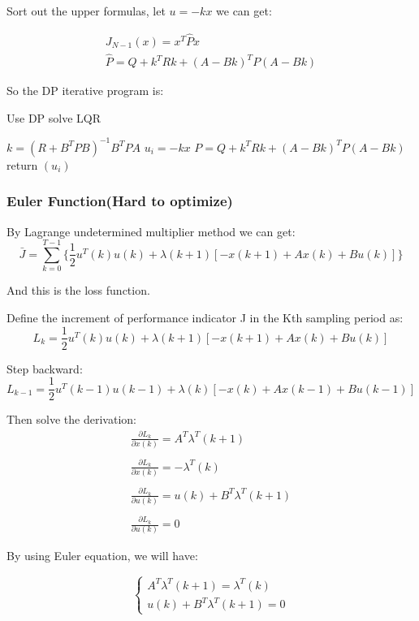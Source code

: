 \documentclass{mcmthesis}
\begin{document}
Sort out the upper formulas, let $u=-k x$ we can get:

$$\begin{array}{c}
J_{N-1}(x)=x^{T} \hat{P} x \\
\hat{P}=Q+k^{T} R k+(A-B k)^{T} P(A-B k)
\end{array}$$

So the DP  iterative program is:

\begin{algorithm}[H]
  \caption{Use DP solve LQR}
  {
    $k=\left(R+B^{T} P B\right)^{-1} B^{T} P A$ \;
$ u_{i}=-k x $\;
$ P=Q+k^{T} R k+(A-B k)^{T} P(A-B k)$
  }
  return $(u_i)$\;
\end{algorithm}

\subsubsection{Euler Function(Hard to optimize)}
By Lagrange undetermined multiplier method we can get:
$$\bar J=\sum^{T-1}_{k=0}\{\frac{1}{2}u^T(k)u(k)+\lambda(k+1)[-x(k+1)+Ax(k)+Bu(k)]\}$$

And this is the loss function.

Define the increment of performance indicator J in the Kth sampling period as:
$$L_k=\frac{1}{2}u^T(k)u(k)+\lambda(k+1)[-x(k+1)+Ax(k)+Bu(k)]$$

Step backward:
$$L_{k-1}=\frac{1}{2}u^T(k-1)u(k-1)+\lambda(k)[-x(k)+Ax(k-1)+Bu(k-1)]$$

Then solve the  derivation:
\begin{equation}\begin{array}{l}
\frac{\partial L_{k}}{\partial x(k)}=A^{T} \lambda^{T}(k+1) \\\\
\frac{\partial L_{k}}{\partial x(k)}=-\lambda^{T}(k) \\\\
\frac{\partial L_{k}}{\partial u(k)}=u(k)+B^{T} \lambda^{T}(k+1) \\\\
\frac{\partial L_{k}}{\partial u(k)}=0
\end{array}\end{equation}

By using Euler equation, we will have:

$$\begin{cases} A^T\lambda^T(k+1) =\lambda^T(k) \\u(k)+B^T\lambda^T(k+1)=0 \end{cases}$$
\end{document}
